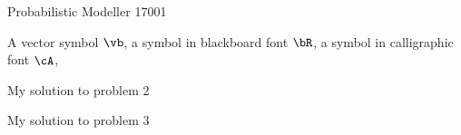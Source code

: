 \documentclass[a4paper,11pt]{article}
\begin{document}
{Probabilistic Modeller}   %
{17001}	%

\begin{pmisolution}

A vector symbol $\vb$, a symbol in blackboard font $\bR$, a symbol in calligraphic font $\cA$,   


\end{pmisolution}

\begin{pmisolution} 

My solution to problem 2


\end{pmisolution}

\begin{pmisolution}

My solution to problem 3

\end{pmisolution}
\end{document}
